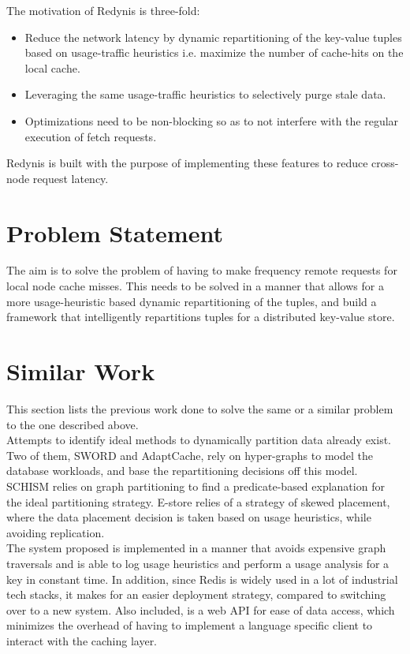 \documentclass{sig-alternate}
\begin{document}
The motivation of Redynis is three-fold:
\begin{itemize}
	\item Reduce the network latency by dynamic repartitioning of the key-value tuples based on usage-traffic heuristics i.e. maximize the number of cache-hits on the local cache.
	\item Leveraging the same usage-traffic heuristics to selectively purge stale data.
	\item Optimizations need to be non-blocking so as to not interfere with the regular execution of fetch requests.
\end{itemize}

Redynis is built with the purpose of implementing these features to reduce cross-node request latency.


\section{Problem Statement}
The aim is to solve the problem of having to make frequency remote requests for local node cache misses. This needs to be solved in a manner that allows for a more usage-heuristic based dynamic repartitioning of the tuples, and build a framework that intelligently repartitions tuples for a distributed key-value store.\\


\section{Similar Work}
This section lists the previous work done to solve the same or a similar problem to the one described above.\\

Attempts to identify ideal methods to dynamically partition data already exist. Two of them, SWORD\cite{quamar2013sword} and AdaptCache\cite{asad2016adaptcache}, rely on hyper-graphs to model the database workloads, and base the repartitioning decisions off this model. SCHISM\cite{curino2010schism} relies on graph partitioning to find a predicate-based explanation for the ideal partitioning strategy. E-store\cite{taft2014store} relies of a strategy of skewed placement, where the data placement decision is taken based on usage heuristics, while avoiding replication. \\

The system proposed is implemented in a manner that avoids expensive graph traversals and is able to log usage heuristics and perform a usage analysis for a key in constant time. In addition, since Redis is widely used in a lot of industrial tech stacks\cite{redis-popularity}, it makes for an easier deployment strategy, compared to switching over to a new system. Also included, is a web API for ease of data access, which minimizes the overhead of having to implement a language specific client to interact with the caching layer.\\
\end{document}
